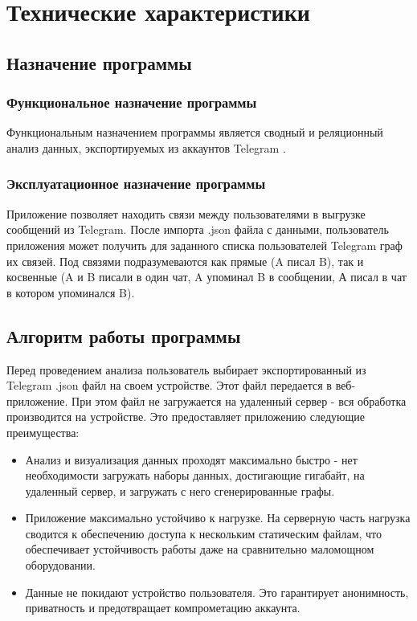 \section{Технические характеристики}

\subsection{Назначение программы}

\subsubsection{Функциональное назначение программы}

Функциональным назначением программы является сводный и реляционный анализ данных, экспортируемых из аккаунтов Telegram \cite{telegram}.

\subsubsection{Эксплуатационное назначение программы}

Приложение позволяет находить связи между пользователями в выгрузке сообщений из Telegram.
После импорта .json файла с данными, пользователь приложения может получить для заданного списка пользователей Telegram граф их связей.
Под связями подразумеваются как прямые (A писал B), так и косвенные (A и B писали в один чат, A упоминал B в сообщении, А писал в чат в котором упоминался B).

\subsection{Алгоритм работы программы}

Перед проведением анализа пользователь выбирает экспортированный из Telegram .json файл на своем устройстве. Этот файл передается в веб-приложение.
При этом файл не загружается на удаленный сервер - вся обработка производится на устройстве. 
Это предоставляет приложению следующие преимущества:

\begin{itemize}
    \item Анализ и визуализация данных проходят максимально быстро - нет необходимости загружать наборы данных, достигающие гигабайт, на удаленный сервер, и загружать с него сгенерированные графы.
    \item Приложение максимально устойчиво к нагрузке. На серверную часть нагрузка сводится к обеспечению доступа к нескольким статическим файлам, что обеспечивает устойчивость работы даже на сравнительно маломощном оборудовании.
    \item Данные не покидают устройство пользователя. Это гарантирует анонимность, приватность и предотвращает компрометацию аккаунта.
\end{itemize}

